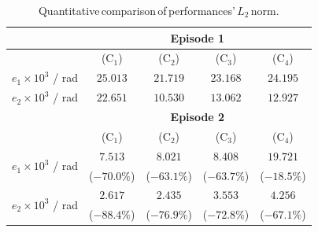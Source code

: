 \documentclass[lettersize,journal]{IEEEtran}
\begin{document}

\begin{table}[!t]
    \renewcommand{\arraystretch}{1.3}
    \caption{Quantitative\,comparison\,of\,performances'\,$L_2$\,norm.}
    \centering
    \begin{tabular}{c c c c c}
    \hline
		& \multicolumn{4}{c}{\textbf{Episode 1}} \\
    \hline
	\hline 
		& (C$_1$) & (C$_2$) & (C$_3$) & (C$_4$) \\
	\hline
		$e_1\times10^{3}$ / rad & $25.013$ & $21.719$ & $23.168$ & $24.195$ \\
	\hline
        $e_2\times10^{3}$ / rad & $22.651$ & $10.530$ & $13.062$ & $12.927$ \\
	\hline
        & \multicolumn{4}{c}{\textbf{Episode 2}} \\
    \hline
    \hline
        & (C$_1$) & (C$_2$) & (C$_3$) & (C$_4$) \\
	\hline
    \multirow{2}{*}{$e_1\times10^{3}$ / rad} 
        & $7.513$ & $8.021$ & $8.408$ & $19.721$ \\
        & ($-70.0\%$) & ($-63.1\%$) & ($-63.7\%$) & ($-18.5\%$) \\
    \hline
    \multirow{2}{*}{$e_2\times10^{3}$ / rad} 
        & $2.617$ & $2.435$ & $3.553$ & $4.256$ \\
        & ($-88.4\%$) & ($-76.9\%$) & ($-72.8\%$) & ($-67.1\%$) \\
    \hline
    \end{tabular}
    \label{tab:sim:L2}
\end{table}
\end{document}

